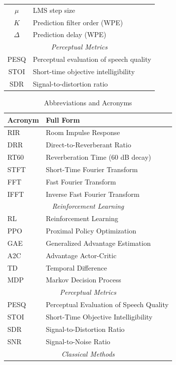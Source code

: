 \documentclass[12pt,a4paper]{article}
\begin{document}
\begin{table}[h]
\begin{tabular}{cl}
$\mu$ & LMS step size \\
$K$ & Prediction filter order (WPE) \\
$\Delta$ & Prediction delay (WPE) \\
\midrule
\multicolumn{2}{c}{\textit{Perceptual Metrics}} \\
\midrule
PESQ & Perceptual evaluation of speech quality \\
STOI & Short-time objective intelligibility \\
SDR & Signal-to-distortion ratio \\
\bottomrule
\end{tabular}
\end{table}

\begin{table}[h]
\centering
\caption{Abbreviations and Acronyms}
\label{tab:abbreviations}
\small
\begin{tabular}{ll}
\toprule
\textbf{Acronym} & \textbf{Full Form} \\
\midrule
RIR & Room Impulse Response \\
DRR & Direct-to-Reverberant Ratio \\
RT60 & Reverberation Time (60 dB decay) \\
STFT & Short-Time Fourier Transform \\
FFT & Fast Fourier Transform \\
IFFT & Inverse Fast Fourier Transform \\
\midrule
\multicolumn{2}{c}{\textit{Reinforcement Learning}} \\
\midrule
RL & Reinforcement Learning \\
PPO & Proximal Policy Optimization \\
GAE & Generalized Advantage Estimation \\
A2C & Advantage Actor-Critic \\
TD & Temporal Difference \\
MDP & Markov Decision Process \\
\midrule
\multicolumn{2}{c}{\textit{Perceptual Metrics}} \\
\midrule
PESQ & Perceptual Evaluation of Speech Quality \\
STOI & Short-Time Objective Intelligibility \\
SDR & Signal-to-Distortion Ratio \\
SNR & Signal-to-Noise Ratio \\
\midrule
\multicolumn{2}{c}{\textit{Classical Methods}} \\
\midrule

\end{tabular}
\end{table}
\end{document}

